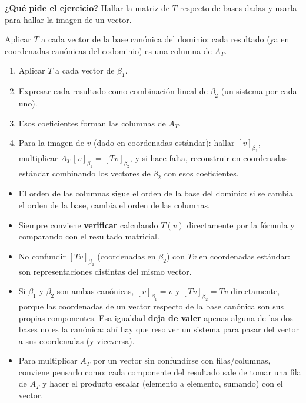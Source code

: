 \documentclass[11pt,a4paper]{article}
\newcommand{\qpide}[1]{\textbf{¿Qué pide el ejercicio?} #1\par}
\begin{document}
\qpide{Hallar la matriz de $T$ respecto de bases dadas y usarla para hallar la imagen de
un vector.}

\begin{proc}
Aplicar $T$ a cada vector de la base canónica del dominio; cada resultado (ya en
coordenadas canónicas del codominio) es una columna de $A_T$.
\end{proc}

\begin{proc}
\begin{enumerate}
    \item Aplicar $T$ a cada vector de $\beta_1$.
    \item Expresar cada resultado como combinación lineal de $\beta_2$ (un sistema por
    cada uno).
    \item Esos coeficientes forman las columnas de $A_T$.
    \item Para la imagen de $v$ (dado en coordenadas estándar): hallar $[v]_{\beta_1}$,
    multiplicar $A_T\,[v]_{\beta_1}=[Tv]_{\beta_2}$, y si hace falta,
    reconstruir en coordenadas estándar combinando los vectores de $\beta_2$ con esos
    coeficientes.
\end{enumerate}
\end{proc}

\begin{atencion}
\begin{itemize}
    \item El orden de las columnas sigue el orden de la base del dominio: si se cambia el
    orden de la base, cambia el orden de las columnas.
    \item Siempre conviene \textbf{verificar} calculando $T(v)$ directamente por la
    fórmula y comparando con el resultado matricial.
    \item No confundir $[Tv]_{\beta_2}$ (coordenadas en $\beta_2$) con $Tv$ en coordenadas
    estándar: son representaciones distintas del mismo vector.
    \item Si $\beta_1$ y $\beta_2$ son ambas canónicas, $[v]_{\beta_1}=v$ y $[Tv]_{\beta_2}=Tv$
    directamente, porque las coordenadas de un vector respecto de la base canónica son sus
    propias componentes. Esa igualdad \textbf{deja de valer} apenas alguna de las dos bases
    no es la canónica: ahí hay que resolver un sistema para pasar del vector a sus
    coordenadas (y viceversa).
    \item Para multiplicar $A_T$ por un vector sin confundirse con filas/columnas, conviene
    pensarlo como: cada componente del resultado sale de tomar una fila de $A_T$ y hacer el
    producto escalar (elemento a elemento, sumando) con el vector.
\end{itemize}
\end{atencion}
\end{document}
